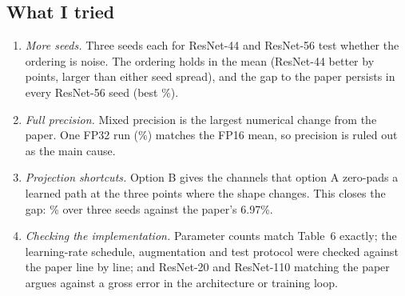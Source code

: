 \documentclass[conference]{IEEEtran}
\begin{document}
\subsection{What I tried}
\begin{enumerate}
\item \emph{More seeds.} Three seeds each for ResNet-44 and ResNet-56 test whether the ordering is noise. The ordering holds in the mean (ResNet-44 better by  points, larger than either seed spread), and the gap to the paper persists in every ResNet-56 seed (best \%).
\item \emph{Full precision.} Mixed precision is the largest numerical change from the paper. One FP32 run (\%) matches the FP16 mean, so precision is ruled out as the main cause.
\item \emph{Projection shortcuts.} Option B gives the channels that option A zero-pads a learned path at the three points where the shape changes. This closes the gap: \% over three seeds against the paper's 6.97\%.
\item \emph{Checking the implementation.} Parameter counts match Table~6 exactly; the learning-rate schedule, augmentation and test protocol were checked against the paper line by line; and ResNet-20 and ResNet-110 matching the paper argues against a gross error in the architecture or training loop.
\end{enumerate}
\end{document}
